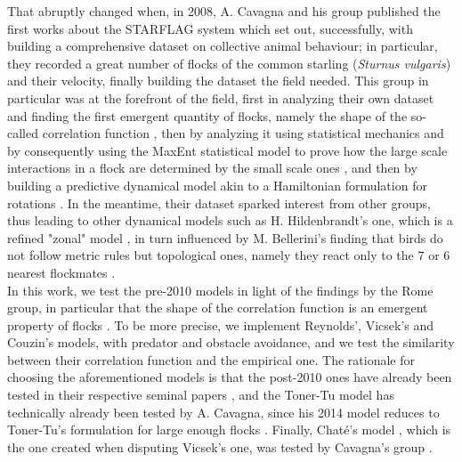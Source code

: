 That abruptly changed when, in 2008, A. Cavagna and his group published the first works about the STARFLAG system \cite{cavagna2008starflag1} \cite{cavagna2008starflag2} which set out, successfully, with building a comprehensive dataset on collective animal behaviour; in particular, they recorded a great number of flocks of the common starling (\textit{Sturnus vulgaris}) and their velocity, finally building the dataset the field needed. This group in particular was at the forefront of the field, first in analyzing their own dataset and finding the first emergent quantity of flocks, namely the shape of the so-called correlation function \cite{cavagna_2010}, then by analyzing it using statistical mechanics and by consequently using the MaxEnt statistical model to prove how the large scale interactions in a flock are determined by the small scale ones \cite{cavagna_2012}, and then by building a predictive dynamical model akin to a Hamiltonian formulation for rotations \cite{cavagna_2014}. In the meantime, their dataset sparked interest from other groups, thus leading to other dynamical models such as H. Hildenbrandt's one, which is a refined "zonal" model \cite{h_and_h}, in turn influenced by M. Bellerini's finding that birds do not follow metric rules but topological ones, namely they react only to the 7 or 6 nearest flockmates \cite{bellerini}. \\
In this work, we test the pre-2010 models in light of the findings by the Rome group, in particular that the shape of the correlation function is an emergent property of flocks \cite{cavagna_2010}. To be more precise, we implement Reynolds', Vicsek's and Couzin's models, with predator and obstacle avoidance, and we test the similarity between their correlation function and the empirical one. The rationale for choosing the aforementioned models is that the post-2010 ones have already been tested in their respective seminal papers \cite{cavagna_2014} \cite{h_and_h}, and the Toner-Tu model has technically already been tested by A. Cavagna, since his 2014 model reduces to Toner-Tu's formulation for large enough flocks \cite{cavagna_2014}. Finally, Chaté's model \cite{chate}, which is the one created when disputing Vicsek's one, was tested by Cavagna's group \cite{cavagna_2012}.